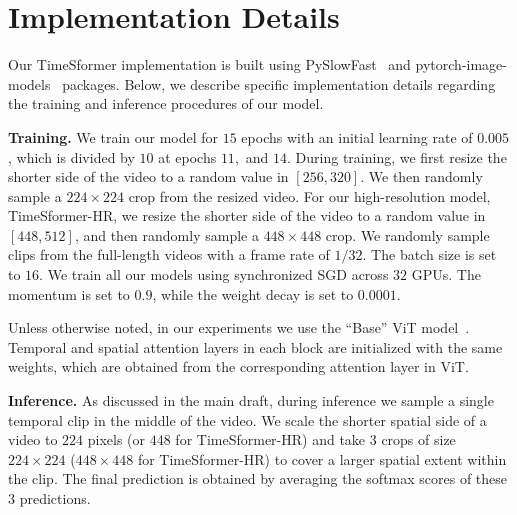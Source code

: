 \documentclass{article}
\begin{document}
\setcounter{figure}{0}
\setcounter{table}{0}
\renewcommand{\thetable}{A.\arabic{table}}
\renewcommand{\thefigure}{A.\arabic{figure}}




\section{Implementation Details}

Our TimeSformer implementation is built using PySlowFast~\cite{fan2020pyslowfast} and pytorch-image-models~\cite{rw2019timm} packages. Below, we describe specific implementation details regarding the training and inference procedures of our model.

\textbf{Training.} We train our model for $15$ epochs with an initial learning rate of $0.005$, which is divided by $10$ at epochs $11,$ and $14$. During training, we first resize the shorter side of the video to a random value in $[256, 320]$. We then randomly sample a $224 \times 224$ crop from the resized video. For our high-resolution model, TimeSformer-HR, we resize the shorter side of the video to a random value in $[448, 512]$, and then randomly sample a $448 \times 448$ crop. We randomly sample clips from the full-length videos with a frame rate of $1/32$. The batch size is set to $16$. We train all our models using synchronized SGD across $32$ GPUs. The momentum is set to $0.9$, while the weight decay is set to $0.0001$. 

Unless otherwise noted, in our experiments we use the ``Base'' ViT model~\cite{Dosovitskiy:ICLR2021}.  Temporal and spatial attention layers in each block are initialized with the same weights, which are obtained from the corresponding attention layer in ViT. %

\textbf{Inference.} As discussed in the main draft, during inference we sample a single temporal clip in the middle of the video. We scale the shorter spatial side of a video to $224$ pixels (or $448$ for TimeSformer-HR) and take $3$ crops of size $224\times224$ ($448\times448$ for TimeSformer-HR) to cover a larger spatial extent within the clip. The final prediction is obtained by averaging the softmax scores of these $3$ predictions.
\end{document}
